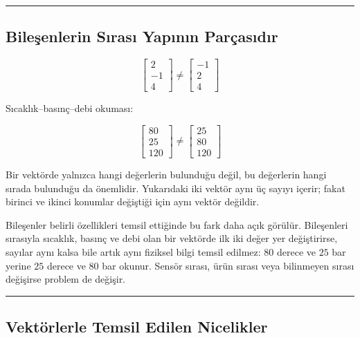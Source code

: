 \documentclass[
  a4paper,
  DIV=11,
  numbers=noendperiod]{scrartcl}
\begin{document}
\begin{center}\rule{0.5\linewidth}{0.5pt}\end{center}

\subsection{Bileşenlerin Sırası Yapının
Parçasıdır}\label{bileux15fenlerin-sux131rasux131-yapux131nux131n-paruxe7asux131dux131r}

\[
\begin{bmatrix}2\\-1\\4\end{bmatrix}
\neq
\begin{bmatrix}-1\\2\\4\end{bmatrix}
\]

Sıcaklık--basınç--debi okuması:

\[
\begin{bmatrix}80\\25\\120\end{bmatrix}
\neq
\begin{bmatrix}25\\80\\120\end{bmatrix}
\]

Bir vektörde yalnızca hangi değerlerin bulunduğu değil, bu değerlerin
hangi sırada bulunduğu da önemlidir. Yukarıdaki iki vektör aynı üç
sayıyı içerir; fakat birinci ve ikinci konumlar değiştiği için aynı
vektör değildir.

Bileşenler belirli özellikleri temsil ettiğinde bu fark daha açık
görülür. Bileşenleri sırasıyla sıcaklık, basınç ve debi olan bir
vektörde ilk iki değer yer değiştirirse, sayılar aynı kalsa bile artık
aynı fiziksel bilgi temsil edilmez: \(80\) derece ve \(25\) bar yerine
\(25\) derece ve \(80\) bar okunur. Sensör sırası, ürün sırası veya
bilinmeyen sırası değişirse problem de değişir.

\begin{center}\rule{0.5\linewidth}{0.5pt}\end{center}

\subsection{Vektörlerle Temsil Edilen
Nicelikler}\label{vektuxf6rlerle-temsil-edilen-nicelikler}
\end{document}
